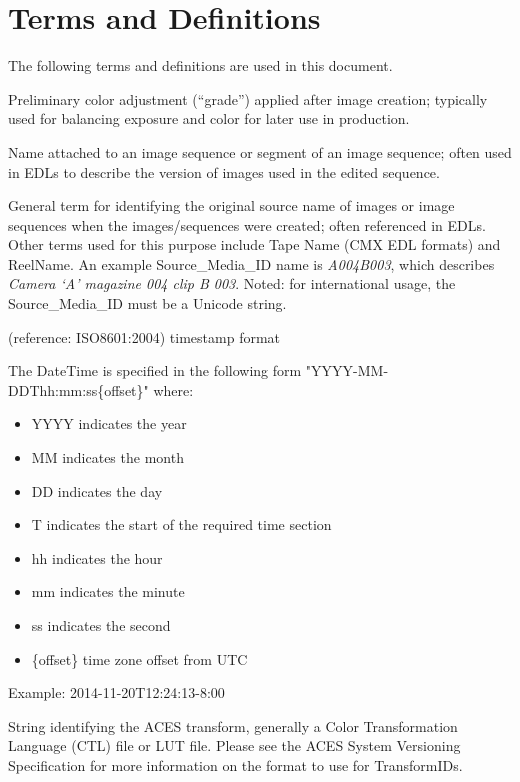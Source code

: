 \numberedformat
\chapter{Terms and Definitions}
The following terms and definitions are used in this document.

Preliminary color adjustment (``grade'') applied after image creation; typically used for balancing exposure and color for later use in production.

Name attached to an image sequence or segment of an image sequence; often used in EDLs to describe the version of images used in the edited sequence.  

General term for identifying the original source name of images or image sequences when the images/sequences were created; often referenced in EDLs. Other terms used for this purpose include Tape Name (CMX EDL formats) and ReelName. An example Source\_Media\_ID name is \textit{A004B003}, which describes \textit{Camera `A' magazine 004  clip B  003}. Noted: for international usage, the Source\_Media\_ID must be a Unicode string.

(reference: ISO8601:2004) timestamp format  

The DateTime is specified in the following form "YYYY-MM-DDThh:mm:ss\{offset\}" where:
\begin{itemize}
    \item YYYY indicates the year
    \item MM indicates the month
    \item DD indicates the day
    \item T indicates the start of the required time section
    \item hh indicates the hour
    \item mm indicates the minute
    \item ss indicates the second
    \item \{offset\} time zone offset from UTC
\end{itemize}

Example:  2014-11-20T12:24:13-8:00

String identifying the ACES transform, generally a Color Transformation Language (CTL) file or LUT file. Please see the ACES System Versioning Specification for more information on the format to use for TransformIDs.